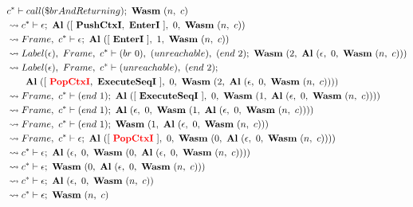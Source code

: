  \\
\begin{align}
  &c^* \vdash call(\$brAndReturning); ~ \textbf{Wasm} ~ (n, ~ c)
  \label{eq:resolve-1} \\
  &\leadsto c^* \vdash \epsilon; ~ \textbf{Al} ~ ([ ~ \textbf{PushCtxI}, ~ \textbf{EnterI} ~ ], ~ 0, ~ \textbf{Wasm} ~ (n, ~ c))
  \label{eq:resolve-2} \\
  &\leadsto Frame, ~ c^* \vdash \epsilon; ~ \textbf{Al} ~ ([ ~ \textbf{EnterI} ~ ], ~ 1, ~ \textbf{Wasm} ~ (n, ~ c))
  \label{eq:resolve-3} \\
  &\leadsto Label(\epsilon), ~ Frame, ~ c^* \vdash (br ~ 0), ~ (unreachable), ~ (end ~ 2); ~
    \textbf{Wasm} ~ (2, ~ \textbf{Al} ~ (\epsilon, ~ 0, ~ \textbf{Wasm} ~ (n, ~ c)))
  \label{eq:resolve-4} \\
  &\leadsto Label(\epsilon), ~ Frame, ~ c^* \vdash (unreachable), ~ (end ~ 2); \\
  &\quad\quad \textbf{Al} ~ ([ ~ \textcolor{red}{\textbf{PopCtxI}}, ~ \textbf{ExecuteSeqI} ~ ], ~ 0, ~ \textbf{Wasm} ~ (2, ~ \textbf{Al} ~ (\epsilon, ~ 0, ~ \textbf{Wasm} ~ (n, ~ c))))
  \label{eq:resolve-5} \\
  &\leadsto Frame, ~ c^* \vdash (end ~ 1); ~
    \textbf{Al} ~ ([ ~ \textbf{ExecuteSeqI} ~ ], ~ 0, ~ \textbf{Wasm} ~ (1, ~ \textbf{Al} ~ (\epsilon, ~ 0, ~ \textbf{Wasm} ~ (n, ~ c))))
  \label{eq:resolve-6} \\
  &\leadsto Frame, ~ c^* \vdash (end ~ 1); ~
    \textbf{Al} ~ (\epsilon, ~ 0, ~ \textbf{Wasm} ~ (1, ~ \textbf{Al} ~ (\epsilon, ~ 0, ~ \textbf{Wasm} ~ (n, ~ c))))
  \label{eq:resolve-7} \\
  &\leadsto Frame, ~ c^* \vdash (end ~ 1); ~ \textbf{Wasm} ~ (1, ~ \textbf{Al} ~ (\epsilon, ~ 0, ~ \textbf{Wasm} ~ (n, ~ c)))
  \label{eq:resolve-8} \\
  &\leadsto Frame, ~ c^* \vdash \epsilon; ~
    \textbf{Al} ~ ([ ~ \textcolor{red}{\textbf{PopCtxI}} ~ ], ~ 0, ~ \textbf{Wasm} ~ (0, ~ \textbf{Al} ~ (\epsilon, ~ 0, ~ \textbf{Wasm} ~ (n, ~ c))))
  \label{eq:resolve-9} \\
  &\leadsto c^* \vdash \epsilon; ~
    \textbf{Al} ~ (\epsilon, ~ 0, ~ \textbf{Wasm} ~ (0, ~ \textbf{Al} ~ (\epsilon, ~ 0, ~ \textbf{Wasm} ~ (n, ~ c))))
  \label{eq:resolve-10} \\
  &\leadsto c^* \vdash \epsilon; ~ \textbf{Wasm} ~ (0, ~ \textbf{Al} ~ (\epsilon, ~ 0, ~ \textbf{Wasm} ~ (n, ~ c)))
  \label{eq:resolve-11} \\
  &\leadsto c^* \vdash \epsilon; ~ \textbf{Al} ~ (\epsilon, ~ 0, ~ \textbf{Wasm} ~ (n, ~ c))
  \label{eq:resolve-12} \\
  &\leadsto c^* \vdash \epsilon; ~ \textbf{Wasm} ~ (n, ~ c)
  \label{eq:resolve-13}
\end{align}
